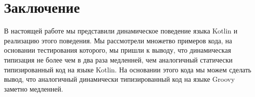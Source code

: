\section*{Заключение}

В настоящей работе мы представили динамическое поведение языка Kotlin и реализацию этого поведения. Мы рассмотрели множетво примеров кода, на основании тестирования которого, мы пришли к выводу, что динамическая типизация не более чем в два раза медленней, чем аналогичный статически типизированный код на языке Kotlin. На основании этого кода мы можем сделать вывод, что аналогичный динамически типизированный код на языке Groovy заметно медленней.
